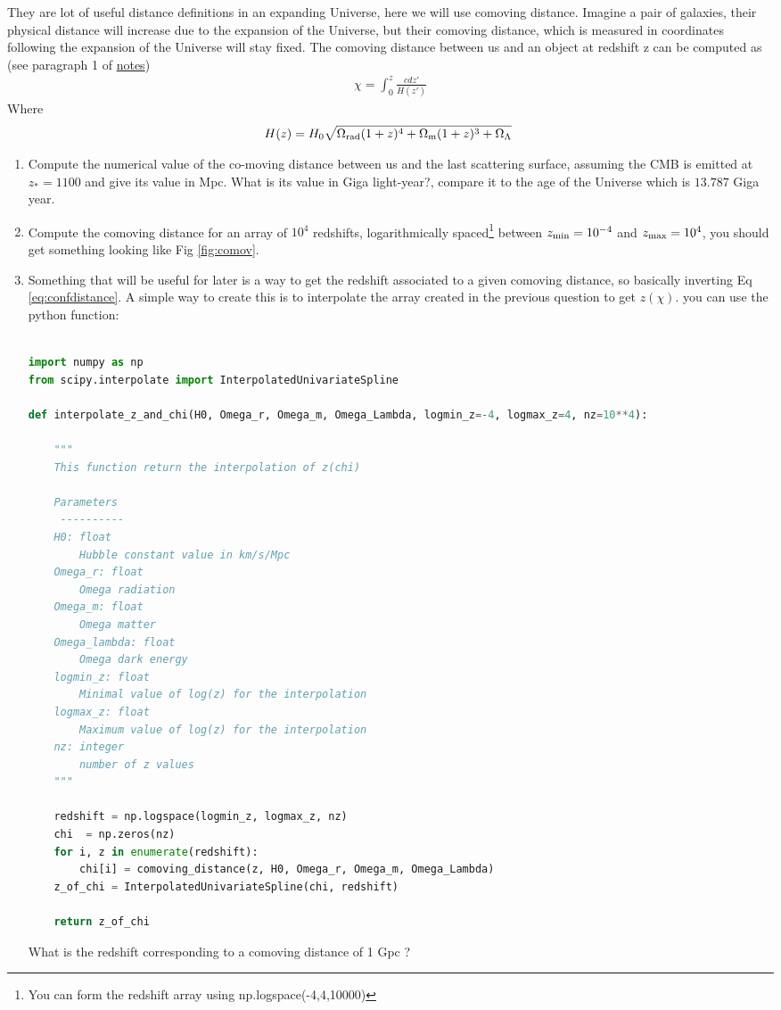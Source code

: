 \documentclass[a4paper, 11pt]{article}
\def\ba{\begin{eqnarray}}
\def\ea{\end{eqnarray}}
\begin{document}
They are lot of useful distance definitions in an expanding Universe, here we will use comoving distance. Imagine a pair of galaxies, their physical distance will increase due to the expansion of the Universe, but their comoving distance, which is measured in coordinates following the expansion of the Universe will stay fixed.
The comoving distance between us and an object at redshift z can be computed as  (see paragraph 1 of \href{https://github.com/thibautlouis/thibautlouis.github.io/blob/master/derivation.pdf}{notes})
\ba
\chi  = \int^{z}_{0}  \frac{c dz'}{ H(z')} \label{eq:confdistance}
\ea
Where 
\ba
H(z) = H_{0} \sqrt{ \Omega_{\rm rad}(1+z)^{4} + \Omega_{\rm m}(1+z)^{3} + \Omega_{\Lambda}} 
\ea
\begin{enumerate}
\item Compute the numerical value of the co-moving distance between us and the last scattering surface, assuming the CMB is emitted at $z_{*}=1100$ and give its value in Mpc. What is its value in Giga light-year?, compare it to the age of the Universe which is $13.787$ Giga year.
\item Compute the comoving distance for an array of $10^{4}$ redshifts, logarithmically spaced\footnote{You can form the redshift array using np.logspace(-4,4,10000)}  between $z_{\rm min}=10^{-4}$ and $z_{\rm max}=10^{4}$, you should get something looking like Fig \ref{fig:comov}. 
 \item Something that will be useful for later is a way to get the redshift associated to a given comoving distance, so basically inverting Eq \ref{eq:confdistance}. A simple way to create this is to interpolate the array created in the previous question to get $z(\chi)$. you can use the python function: \\ \\
 
 \begin{lstlisting}[language=Python]
import numpy as np
from scipy.interpolate import InterpolatedUnivariateSpline

def interpolate_z_and_chi(H0, Omega_r, Omega_m, Omega_Lambda, logmin_z=-4, logmax_z=4, nz=10**4):

    """
    This function return the interpolation of z(chi)
    
    Parameters
     ----------
    H0: float
        Hubble constant value in km/s/Mpc
    Omega_r: float
        Omega radiation
    Omega_m: float
        Omega matter
    Omega_lambda: float
        Omega dark energy
    logmin_z: float
        Minimal value of log(z) for the interpolation
    logmax_z: float
        Maximum value of log(z) for the interpolation
    nz: integer
        number of z values
    """

    redshift = np.logspace(logmin_z, logmax_z, nz)
    chi  = np.zeros(nz)
    for i, z in enumerate(redshift):
        chi[i] = comoving_distance(z, H0, Omega_r, Omega_m, Omega_Lambda)
    z_of_chi = InterpolatedUnivariateSpline(chi, redshift)

    return z_of_chi

\end{lstlisting}

What is the redshift corresponding to a comoving distance of 1 Gpc ?
\end{enumerate}
\end{document}
